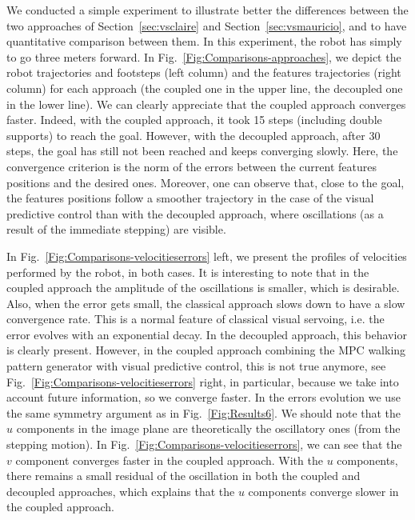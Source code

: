 We conducted a simple experiment to illustrate better the differences between the two approaches of Section~\ref{sec:vsclaire} and Section~\ref{sec:vsmauricio}, and to have quantitative comparison between them. In this experiment, the robot has simply to go three meters forward. In Fig.~\ref{Fig:Comparisons-approaches}, we depict the robot trajectories and footsteps (left column) and the features trajectories (right column) for each approach (the coupled one in the upper line, the decoupled one in the lower line). We can clearly appreciate that the coupled approach converges faster. Indeed, with the coupled approach, it took 15 steps (including double supports) to reach the goal. However, with the decoupled approach, after 30 steps, the goal  has still not been reached and keeps converging slowly. Here, the convergence criterion is the norm of the errors between the current features positions and the desired ones. Moreover, one can observe that, close to the goal, the features positions follow a smoother trajectory in the case of the visual predictive control than with the decoupled approach, where oscillations (as a result of the immediate stepping) are visible.

In Fig.~\ref{Fig:Comparisons-velocitieserrors} left, we present the profiles of velocities performed by the robot, in both cases. It is interesting to note that in the coupled approach the amplitude of the oscillations is smaller, which is desirable. Also, when the error gets small, the classical approach slows down to have a slow convergence rate. This is a normal feature of classical visual servoing, i.e. the error evolves with an exponential decay. In the decoupled approach, this behavior is clearly present. However, in the coupled approach combining the MPC walking pattern generator with visual predictive control, this is not true anymore, see Fig.~\ref{Fig:Comparisons-velocitieserrors} right, in particular, because we take into account future information, so we converge faster. In the errors evolution we use the same symmetry argument as in Fig.~\ref{Fig:Results6}. We should note that the $u$ components in the image plane are theoretically the oscillatory ones (from the stepping motion). In Fig.~\ref{Fig:Comparisons-velocitieserrors}, we can see that the $v$ component converges faster in the coupled approach. With the $u$ components, there remains a small residual of the oscillation in both the coupled and decoupled approaches, which explains that the $u$ components converge slower in the coupled approach.


